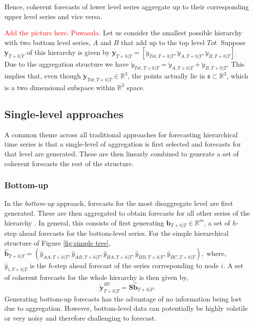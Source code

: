 \documentclass[graybox]{svmult}
\begin{document}
Hence, coherent forecasts of lower level series aggregate up to their corresponding upper level series and vice versa.

\textcolor{red}{Add the picture here. Puwasala.}
Let us consider the smallest possible hierarchy with two bottom level series, $A$ and $B$ that add up to the top level $Tot$. Suppose $\breve{\bm{y}}_{T+h|T}$ of this hierarchy is given by $\breve{\bm{y}}_{T+h|T} = [\breve{y}_{Tot,T+h|T},\breve{y}_{A,T+h|T}, \breve{y}_{B,T+h|T}]$. Due to the aggregation structure we have $\breve{y}_{Tot,T+h|T}=\breve{y}_{A,T+h|T}+\breve{y}_{B,T+h|T}$. This implies that, even though  $\breve{\bm{y}}_{Tot,T+h|T} \in \mathbb{R}^3$, the points actually lie in $\mathfrak{s}\subset \mathbb{R}^3$, which is a two dimensional subspace within $\mathbb{R}^3$ space.

\subsection{Single-level approaches}\label{sec:single level approaches}
A common theme across all traditional approaches for forecasting hierarchical time series is that a single-level of aggregation is first selected and forecasts for that level are generated. These are then linearly combined to generate a set of coherent forecasts the rest of the structure.

\subsubsection{Bottom-up}

In the \textit{bottom-up} approach, forecasts for the most disaggregate level are first generated. These are then aggregated to obtain forecasts for all other series of the hierarchy \citep{dunn1976}. In general, this consists of first generating $\hat{\bm{b}}_{T+h|T} \in \mathbb{R}^m$, a set of $h$-step ahead forecasts for the bottom-level series. For the simple hierarchical structure of Figure \ref{fig:simple tree}, $\hat{\bm{b}}_{T+h|T} = (\hat{{y}}_{AA,T+h|T}, \hat{{y}}_{AB,T+h|T}, \hat{{y}}_{BA,T+h|T}, \hat{{y}}_{BB,T+h|T},\hat{{y}}_{BC,T+h|T}),$ where, $\hat{{y}}_{i,T+h|T}$ is the $h$-step ahead forecast of the series corresponding to node $i$. A set of coherent forecasts for the whole hierarchy is then given by,
\begin{equation*}\label{eq:BU}
\tilde{\bm{y}}^{BU}_{T+h|T}=\bm{S\hat{\bm{b}}}_{T+h|T}.
\end{equation*}
Generating bottom-up forecasts has the advantage of no information being lost due to aggregation. However, bottom-level data can potentially be highly volatile or very noisy and therefore challenging to forecast.
\end{document}
